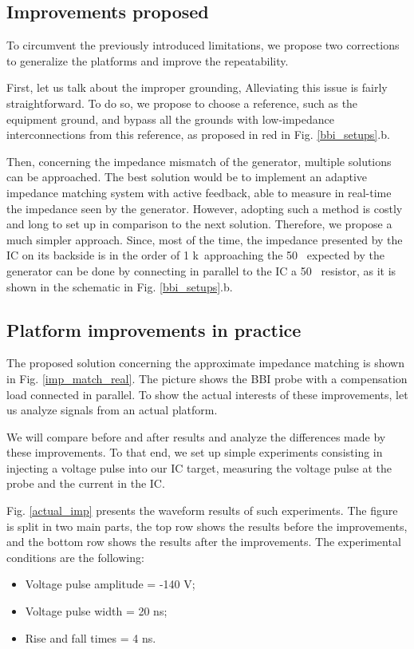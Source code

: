 	\subsection{Improvements proposed}
		To circumvent the previously introduced limitations, we propose two corrections to generalize the platforms and improve the repeatability.
		
		First, let us talk about the improper grounding,
		Alleviating this issue is fairly straightforward.
		To do so, we propose to choose a reference, such as the equipment ground, and bypass all the grounds with low-impedance interconnections from this reference, as proposed in red in Fig. \ref{bbi_setups}.b.
		
		Then, concerning the impedance mismatch of the generator, multiple solutions can be approached.
		The best solution would be to implement an adaptive impedance matching system with active feedback, able to measure in real-time the impedance seen by the generator.
		However, adopting such a method is costly and long to set up in comparison to the next solution.
		Therefore, we propose a much simpler approach.
		Since, most of the time, the impedance presented by the IC on its backside is in the order of 1 k\textOmega\, approaching the 50 \textOmega\ expected by the generator can be done by connecting in parallel to the IC a 50 \textOmega\ resistor, as it is shown in the schematic in Fig. \ref{bbi_setups}.b.
		
	\subsection{Platform improvements in practice}
		
		The proposed solution concerning the approximate impedance matching is shown in Fig. \ref{imp_match_real}.
		The picture shows the BBI probe with a compensation load connected in parallel.
		To show the actual interests of these improvements, let us analyze signals from an actual platform.
		
		We will compare before and after results and analyze the differences made by these improvements.
		To that end, we set up simple experiments consisting in injecting a voltage pulse into our IC target, measuring the voltage pulse at the probe and the current in the IC.
		
		Fig. \ref{actual_imp} presents the waveform results of such experiments.
		The figure is split in two main parts, the top row shows the results before the improvements, and the bottom row shows the results after the improvements.
		The experimental conditions are the following:
		\begin{itemize}
			\item Voltage pulse amplitude = -140 V;
			\item Voltage pulse width = 20 ns;
			\item Rise and fall times = 4 ns.
		\end{itemize}
		
